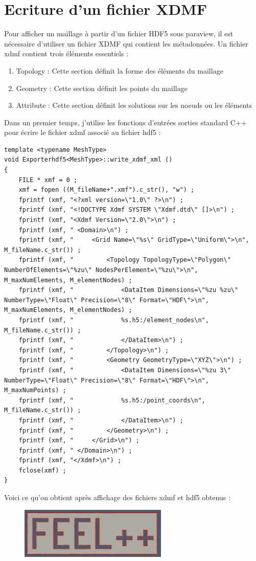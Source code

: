 \documentclass[12pt]{article}
\begin{document}
\section {Ecriture d'un fichier XDMF}
Pour afficher un maillage à partir d'un fichier HDF5 sous paraview, il est nécessaire d'utiliser un fichier XDMF qui contient les métadonnées.
Un fichier xdmf contient trois éléments essentiels :
\begin{enumerate}
\item Topology  : Cette section définit la forme des éléments du maillage
\item Geometry  : Cette section définit les points du maillage
\item Attribute : Cette section définit les solutions sur les noeuds ou les éléments 
\end{enumerate} 
Dans un premier temps, j'utilise les fonctions d'entrées sorties standard C++ pour écrire le fichier xdmf associé au fichier hdf5 :
\begin{lstlisting}
template <typename MeshType>
void Exporterhdf5<MeshType>::write_xdmf_xml ()  
{
    FILE * xmf = 0 ;
    xmf = fopen ((M_fileName+".xmf").c_str(), "w") ;
    fprintf (xmf, "<?xml version=\"1.0\" ?>\n") ;
    fprintf (xmf, "<!DOCTYPE Xdmf SYSTEM \"Xdmf.dtd\" []>\n") ;
    fprintf (xmf, "<Xdmf Version=\"2.0\">\n") ;
    fprintf (xmf, " <Domain>\n") ;
    fprintf (xmf, "     <Grid Name=\"%s\" GridType=\"Uniform\">\n", M_fileName.c_str()) ;
    fprintf (xmf, "         <Topology TopologyType=\"Polygon\" NumberOfElements=\"%zu\" NodesPerElement=\"%zu\">\n", M_maxNumElements, M_elementNodes) ;
    fprintf (xmf, "             <DataItem Dimensions=\"%zu %zu\" NumberType=\"Float\" Precision=\"8\" Format=\"HDF\">\n", M_maxNumElements, M_elementNodes) ;
    fprintf (xmf, "             %s.h5:/element_nodes\n", M_fileName.c_str()) ;
    fprintf (xmf, "             </DataItem>\n") ;
    fprintf (xmf, "         </Topology>\n") ;
    fprintf (xmf, "         <Geometry GeometryType=\"XYZ\">\n") ;
    fprintf (xmf, "             <DataItem Dimensions=\"%zu 3\" NumberType=\"Float\" Precision=\"8\" Format=\"HDF\">\n", M_maxNumPoints) ;
    fprintf (xmf, "             %s.h5:/point_coords\n", M_fileName.c_str()) ;
    fprintf (xmf, "             </DataItem>\n") ;
    fprintf (xmf, "         </Geometry>\n") ;
    fprintf (xmf, "     </Grid>\n") ;
    fprintf (xmf, " </Domain>\n") ;
    fprintf (xmf, "</Xdmf>\n") ;
    fclose(xmf) ;
}
\end{lstlisting}
Voici ce qu'on obtient après affichage des fichiers xdmf et hdf5 obtenus : 
\begin{figure}[!h]
\begin{center}
\includegraphics [width=200pt] {feel.png}
\end{center}
\end{figure}
\end{document}
